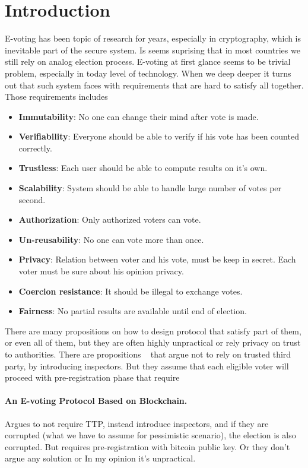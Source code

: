 \documentclass[runningheads]{llncs}
\begin{document}
\section{Introduction}
E-voting has been topic of research for years, especially in cryptography, which is inevitable part of the secure system. Is seems suprising that in most countries we still rely on analog election process. 
E-voting at first glance seems to be trivial problem, especially in today level of technology. When we deep deeper it turns out that such system faces with requirements that are hard to satisfy all together. Those requirements includes
\begin{itemize}
\item \textbf{Immutability}: No one can change their mind after vote is made.
\item \textbf{Verifiability}: Everyone should be able to verify if his vote has been counted correctly.
\item \textbf{Trustless}: Each user should be able to compute results on it's own.
\item \textbf{Scalability}: System should be able to handle large number of votes per second.
\item \textbf{Authorization}: Only authorized voters can vote.
\item \textbf{Un-reusability}: No one can vote more than once.
\item \textbf{Privacy}: Relation between voter and his vote, must be keep in secret. Each voter must be sure about his opinion privacy. 
\item \textbf{Coercion resistance}: It should be illegal to exchange votes.
\item \textbf{Fairness}: No partial results are available until end of election.
\end{itemize}

There are many propositions on how to design protocol that satisfy part of them, or even all of them, but they are often highly unpractical or rely privacy on trust to authorities. There are propositions ~\cite{liu2017voting} that argue not to rely on trusted third party, by introducing inspectors. But they assume that each eligible voter will proceed with pre-registration phase that require 
\paragraph{An E-voting Protocol Based on Blockchain. ~\cite{liu2017voting}}
Argues to not require TTP, instead introduce inspectors, and if they are corrupted (what we have to assume for pessimistic scenario), the election is also corrupted. But requires pre-registration with bitcoin public key. Or they don't argue any solution or In my opinion it's unpractical.
\end{document}
